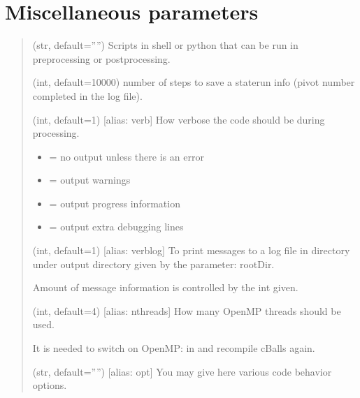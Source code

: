 \documentclass[letterpaper,10pt,english]{sphinxmanual}
\begin{document}
\section{Miscellaneous parameters}
\label{\detokenize{params:miscellaneous-parameters}}\begin{quote}\begin{description}
\sphinxAtStartPar
(str, default=””) Scripts in shell or python that can be run in pre\sphinxhyphen{}processing or post\sphinxhyphen{}processing.

\sphinxAtStartPar
(int, default=10000) number of steps to save a state\sphinxhyphen{}run info (pivot number completed in the log file).

\sphinxAtStartPar
(int, default=1) {[}alias: verb{]} How verbose the code should be during processing.
\begin{itemize}
\item {} 
 = no output unless there is an error

\item {} 
 = output warnings

\item {} 
 = output progress information

\item {} 
 = output extra debugging lines

\end{itemize}

\sphinxAtStartPar
(int, default=1) {[}alias: verblog{]} To print messages to a log file  in directory  under output directory given by the parameter: {\color{red}\bfseries{}\textasciigrave{}\textasciigrave{}}rootDir\textasciigrave{}.

\sphinxAtStartPar
Amount of message information is controlled by the int given.

\sphinxAtStartPar
(int, default=4) {[}alias: nthreads{]} How many OpenMP threads should be used.

\sphinxAtStartPar
It is needed to switch on OpenMP:  in  and recompile cBalls again.

\sphinxAtStartPar
(str, default=””) {[}alias: opt{]} You may give here various code behavior options.


\end{description}
\end{quote}
\end{document}

